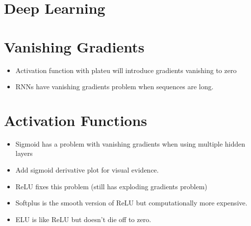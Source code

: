 \documentclass[12pt,a4paper,english
]{tutthesis}
\begin{document}
\section{Deep Learning}

\section{Vanishing Gradients}
\begin{itemize}
\item Activation function with plateu will introduce gradients vanishing to zero
\item RNNs have vanishing gradients problem when sequences are long.
\end{itemize}

\section{Activation Functions}
\begin{itemize}
\item Sigmoid has a problem with vanishing gradients when using multiple hidden layers
\item Add sigmoid derivative plot for visual evidence.
\item ReLU fixes this problem (still has exploding gradients problem)
\item Softplus is the smooth version of ReLU but computationally more expensive.
\item ELU is like ReLU but doesn't die off to zero. \cite{Clevert2015}
\end{itemize}
\end{document}
